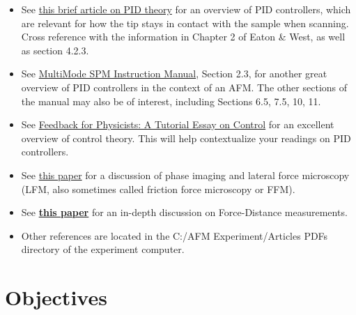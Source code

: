 \documentclass{../lab}
\begin{document}
\begin{itemize}
    \item See \href{https://berkeley-physics111b.github.io/assets/pdf/oldwebsitestructure/PID_Theory_Explained.pdf}{this brief article on PID theory} for an overview of PID controllers, which are relevant for how the tip stays in contact with the sample when scanning. Cross reference with the information in Chapter 2 of Eaton \& West, as well as section 4.2.3. 

    \item See \href{https://www.cigs.unimo.it/cigsdownloads/labs/afm2/manuali_letture/multimode_manual_revb.pdf}{MultiMode SPM Instruction Manual}, Section 2.3, for another great overview of PID controllers in the context of an AFM. The other sections of the manual may also be of interest, including Sections 6.5, 7.5, 10, 11.

    \item See \href{https://www.sfu.ca/biophysics/publications/2005/RMP_feedback.pdf}{Feedback for Physicists: A Tutorial Essay on Control} for an excellent overview of control theory. This will help contextualize your readings on PID controllers.

    \item See \href{https://www.sciencedirect.com/science/article/pii/S0167572902000778}{this paper} for a discussion of phase imaging and lateral force microscopy (LFM, also sometimes called friction force microscopy or FFM).

    \item See \href{https://berkeley-physics111b.github.io/assets/pdf/oldwebsitestructure/AFMImages/butt\_AFM.pdf}{\textbf{this paper}} for an in-depth discussion on Force-Distance measurements.  
    
    \item Other references are located in the C:/AFM Experiment/Articles PDFs directory of the experiment computer.


\end{itemize}

\section{Objectives}
\end{document}
